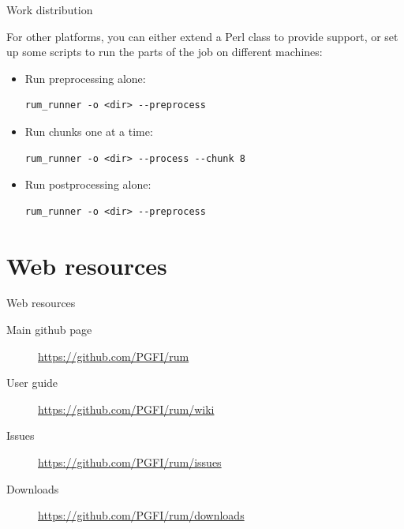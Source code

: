 \documentclass{beamer}
\begin{document}
\begin{frame}[fragile]{Work distribution}

For other platforms, you can either extend a Perl class to provide
support, or set up some scripts to run the parts of the job on
different machines:

\pause

\begin{itemize}
\item  Run preprocessing alone:

\begin{verbatim}
rum_runner -o <dir> --preprocess
\end{verbatim}

\pause

\item Run chunks one at a time:

\begin{verbatim}
rum_runner -o <dir> --process --chunk 8
\end{verbatim}

\pause

\item Run postprocessing alone:

\begin{verbatim}
rum_runner -o <dir> --preprocess
\end{verbatim}

\end{itemize}

\end{frame}


\section{Web resources}

\begin{frame}{Web resources}
  \begin{description}
    \item [Main github page] 
      \url{https://github.com/PGFI/rum}

    \item [User guide] 
      \url{https://github.com/PGFI/rum/wiki}

    \item [Issues] 
      \url{https://github.com/PGFI/rum/issues}

    \item [Downloads] 
      \url{https://github.com/PGFI/rum/downloads}
    
  \end{description}
\end{frame}
\end{document}
